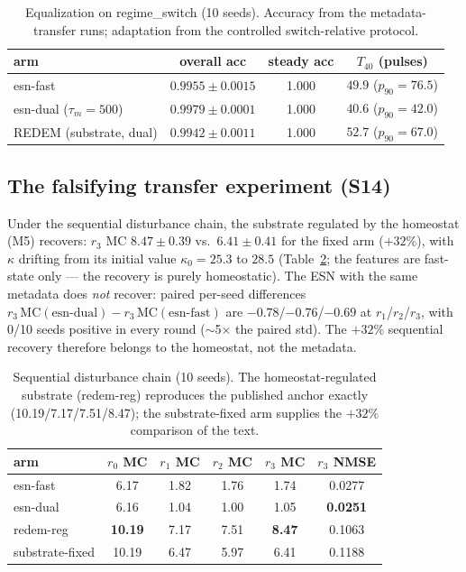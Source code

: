 \documentclass[preprint,12pt]{elsarticle}
\begin{document}
\begin{table}[t]
\centering
\small
\begin{tabular}{lccc}
\toprule
arm & overall acc & steady acc & $T_{40}$ (pulses) \\
\midrule
esn-fast & $0.9955\pm0.0015$ & 1.000 & $49.9$ ($p_{90}=76.5$) \\
esn-dual ($\tau_m{=}500$) & $0.9979\pm0.0001$ & 1.000 & $40.6$ ($p_{90}=42.0$) \\
REDEM (substrate, dual) & $0.9942\pm0.0011$ & 1.000 & $52.7$ ($p_{90}=67.0$) \\
\bottomrule
\end{tabular}
\caption{Equalization on regime\_switch (10 seeds). Accuracy from the
metadata-transfer runs; adaptation from the controlled switch-relative
protocol.}
\label{tab:s10}
\end{table}

\subsection{The falsifying transfer experiment (S14)}
\label{sec:s14}

Under the sequential disturbance chain, the substrate regulated by the
homeostat (M5) recovers: $r_3$ MC $8.47\pm0.39$ vs.\ $6.41\pm0.41$ for the
fixed arm ($+32\%$), with $\kappa$ drifting from its initial value
$\kappa_0=25.3$ to $28.5$
(Table~\ref{tab:s14}; the features are fast-state only --- the recovery is
purely homeostatic). The ESN with the same metadata does \emph{not}
recover: paired per-seed differences
$r_3\,\mathrm{MC}(\text{esn-dual}) - r_3\,\mathrm{MC}(\text{esn-fast})$ are
$-0.78$/$-0.76$/$-0.69$ at $r_1$/$r_2$/$r_3$, with 0/10 seeds positive in
every round ($\sim$5$\times$ the paired std). The $+32\%$ sequential
recovery therefore belongs to the homeostat, not the metadata.

\begin{table}[t]
\centering
\small
\begin{tabular}{lccccc}
\toprule
arm & $r_0$ MC & $r_1$ MC & $r_2$ MC & $r_3$ MC & $r_3$ NMSE \\
\midrule
esn-fast & 6.17 & 1.82 & 1.76 & 1.74 & 0.0277 \\
esn-dual & 6.16 & 1.04 & 1.00 & 1.05 & \textbf{0.0251} \\
redem-reg & \textbf{10.19} & 7.17 & 7.51 & \textbf{8.47} & 0.1063 \\
substrate-fixed & 10.19 & 6.47 & 5.97 & 6.41 & 0.1188 \\
\bottomrule
\end{tabular}
\caption{Sequential disturbance chain (10 seeds). The homeostat-regulated
substrate (redem-reg) reproduces the published anchor exactly
(10.19/7.17/7.51/8.47); the substrate-fixed arm supplies the $+32\%$
comparison of the text.}
\label{tab:s14}
\end{table}
\end{document}
